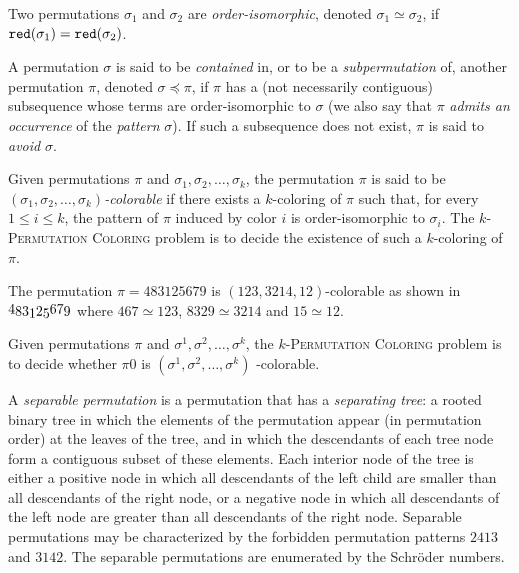 \begin{definition}
    Two permutations $\sigma_1$ and $\sigma_2$ are \emph{order-isomorphic},
    denoted $\sigma_1 \simeq \sigma_2$,
    if $\operatorname{\texttt{red}}(\sigma_1) = \operatorname{\texttt{red}}(\sigma_2)$.
\end{definition}

\begin{definition}
    A permutation $\sigma$ is said to be \emph{contained} in, or to be
    a \emph{subpermutation} of, another permutation $\pi$, denoted
    $\sigma \preceq \pi$, if $\pi$ has a (not necessarily contiguous)
    subsequence whose terms are order-isomorphic to $\sigma$ (we also
    say that $\pi$ \emph{admits an occurrence} of the \emph{pattern}
    $\sigma$).
    If such a subsequence does not exist, $\pi$ is said to \emph{avoid}
    $\sigma$.
\end{definition}

\begin{definition}
  Given permutations $\pi$ and $\sigma_1, \sigma_2, \dots, \sigma_k$,
  the permutation $\pi$ is said to be
  \emph{$(\sigma_1, \sigma_2, \ldots, \sigma_k)$-colorable}
  if there exists a
  $k$-coloring of $\pi$ such that, for every $1 \leq i \leq k$, the
  pattern of $\pi$ induced by color $i$ is order-isomorphic to $\sigma_i$.
  The \textsc{$k$-Permutation Coloring} problem is to decide the existence of
  such a $k$-coloring of $\pi$.
\end{definition}

\begin{example}
The permutation $\pi = 483125679$ is $(123, 3214, 12)$-colorable
as shown in
$
\raisebox{1.5pt}{$4$}
\raisebox{0pt}{$8$}
\raisebox{0pt}{$3$}
\raisebox{-1.5pt}{$1$}
\raisebox{0pt}{$2$}
\raisebox{-1.5pt}{$5$}
\raisebox{1.5pt}{$6$}
\raisebox{1.5pt}{$7$}
\raisebox{0pt}{$9$}
$
where
$467 \simeq 123$,
$8329 \simeq 3214$ and
$15 \simeq 12$.
\end{example}

Given permutations $\pi$ and $\sigma^1, \sigma^2, \ldots, \sigma^k$,
the \textsc{$k$-Permutation Coloring} problem is to decide whether $\pi0$
is $(\sigma^1, \sigma^2, \ldots, \sigma^k)$ -colorable.

A \emph{separable permutation} is a permutation that has a \emph{separating tree}:
a rooted binary tree in which the elements
of the permutation appear (in permutation order) at the leaves of the tree,
and in which the descendants of each tree node form a contiguous subset of
these elements.
Each interior node of the tree is either a positive node in which all
descendants of the left child are smaller than all descendants of the right node,
or a negative node in which all descendants of the left node are greater than all
descendants of the right node.
Separable permutations may be characterized by the forbidden permutation
patterns $2413$ and $3142$.
The separable permutations are enumerated by the Schröder numbers.

